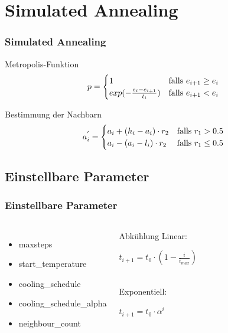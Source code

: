 \section{Simulated Annealing}

\begin{frame}
\frametitle{Simulated Annealing}
    \begin{block}{Metropolis-Funktion}
        \begin{equation}
            p =
            \begin{cases}
                1 & \text{falls } e_{i+1} \ge e_i \\
                exp(- \frac{e_i - e_{i+1}}{t_i}) & \text{falls } e_{i+1} < e_i \notag
            \end{cases}
        \end{equation}
    \end{block}
    \begin{block}{Bestimmung der Nachbarn}
       \begin{equation}
           a_{i}^{'} =
           \begin{cases}
               a_i + (h_i - a_i) \cdot r_2 & \text{falls } r_1 > 0.5 \\
               a_i - (a_i - l_i) \cdot r_2 & \text{falls } r_1 \le 0.5 \notag
           \end{cases}
       \end{equation}
   \end{block}
\end{frame}

\subsection{Einstellbare Parameter}

\begin{frame}
\frametitle{Einstellbare Parameter}
    \begin{columns}
        \begin{itemize}
            \item maxsteps
            \item start\_temperature
            \item cooling\_schedule
            \item cooling\_schedule\_alpha
            \item neighbour\_count
        \end{itemize}
        \begin{block}{Abkühlung}
           Linear: \centerline{$ t_{i+1} = t_0 \cdot ( 1 - \frac{i}{i_{max}}) $} \\
           Exponentiell: \centerline{$ t_{i+1} = t_0 \cdot \alpha^i $} \\
        \end{block}
    \end{columns}
\end{frame}

